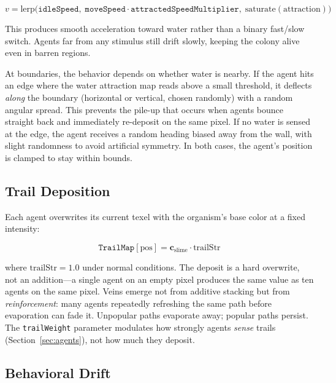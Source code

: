 \documentclass[12pt, titlepage]{article}
\begin{document}
\begin{equation}
    v = \text{lerp}\big(\texttt{idleSpeed},\;
    \texttt{moveSpeed} \cdot \texttt{attractedSpeedMultiplier},\;
    \text{saturate}(\text{attraction})\big)
\end{equation}

This produces smooth acceleration toward water rather than a binary
fast/slow switch. Agents far from any stimulus still drift slowly, keeping the
colony alive even in barren regions.

At boundaries, the behavior depends on whether water is nearby. If the agent
hits an edge where the water attraction map reads above a small threshold, it
deflects \textit{along} the boundary (horizontal or vertical, chosen
randomly) with a random angular spread. This prevents the pile-up that
occurs when agents bounce straight back and immediately re-deposit on the
same pixel. If no water is sensed at the edge, the agent receives a
random heading biased away from the wall, with slight randomness to
avoid artificial symmetry. In both cases, the agent's position is clamped to
stay within bounds.

\subsection{Trail Deposition}

Each agent overwrites its current texel with the organism's base color at a
fixed intensity:

\begin{equation}
    \texttt{TrailMap}[\text{pos}] = \mathbf{c}_{\text{slime}} \cdot
    \text{trailStr}
\end{equation}

where $\text{trailStr} = 1.0$ under normal conditions. The deposit is a hard
overwrite, not an addition---a single agent on an empty pixel produces the
same value as ten agents on the same pixel. Veins emerge not from additive
stacking but from \textit{reinforcement}: many agents repeatedly refreshing
the same path before evaporation can fade it. Unpopular paths evaporate
away; popular paths persist. The \texttt{trailWeight} parameter modulates
how strongly agents \textit{sense} trails (Section~\ref{sec:agents}), not how
much they deposit.

\subsection{Behavioral Drift}
\label{sec:drift}
\end{document}
